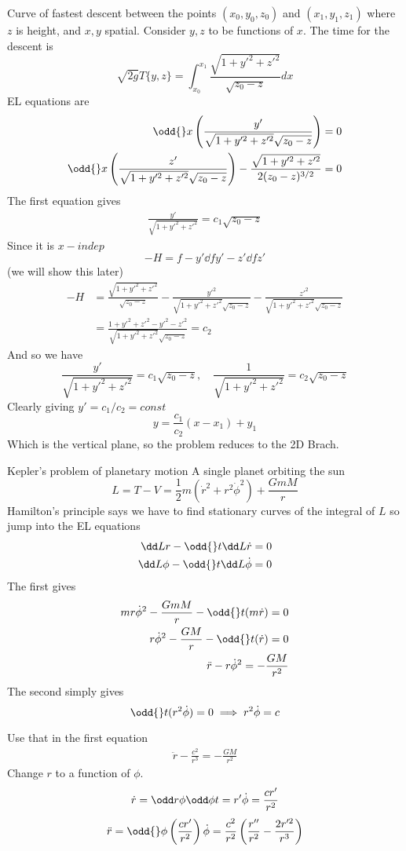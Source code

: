 \documentclass{X:/Documents/Coding/Latex/myassignment}
\begin{document}
Curve of fastest descent between the points $(x_0,y_0,z_0)$ and $(x_1,y_1,z_1)$ where $z$ is height, and $x,y$ spatial. Consider $y,z$ to be functions of $x$. The time for the descent is
\[\sqrt{2g} T\{y,z\} = \int_{x_0}^{x_1} \frac{\sqrt{1 + y'^2 + z'^2}}{\sqrt{z_0 - z}} dx\] 
EL equations are
\begin{align*}
	\odd{}x \left(\frac{y'}{\sqrt{1 + y'^2 + z'^2} \sqrt{z_0 - z}}\right) = 0\\
\odd{}x \left(\frac{z'}{\sqrt{1 + y'^2 + z'^2} \sqrt{z_0 - z}}\right) - \frac{\sqrt{1 + y'^2 + z'^2}}{2(z_0 - z)^{3/2}} = 0
\end{align*}
The first equation gives
\begin{align*}
	\frac{y'}{\sqrt{1 + y'^2 + z'^2}} = c_1\sqrt{z_0-z}
\end{align*}
Since it is $x-indep$
\[-H = f - y'\dd f{y'} - z' \dd f{z'}\]
(we will show this later)
\begin{align*}
	-H &= \frac{\sqrt{1+y'^2+z'^2}}{\sqrt{z_0 -z}} -\frac{y'^2}{\sqrt{1 + y'^2 + z'^2} \sqrt{z_0 - z}} -\frac{z'^2}{\sqrt{1 + y'^2 + z'^2} \sqrt{z_0 - z}}\\
	&=\frac{1 + y'^2 + z'^2 - y'^2 - z'^2}{\sqrt{1 + y'^2 + z'^2} \sqrt{z_0 - z}} = c_2
\end{align*}
And so we have
\[\frac{y'}{\sqrt{1 + y'^2 + z'^2}} = c_1\sqrt{z_0-z}, \quad \frac{1}{\sqrt{1 + y'^2 + z'^2}} = c_2 \sqrt{z_0 - z}\]
Clearly giving $y' = c_1/c_2 = const$
\[y = \frac{c_1}{c_2}(x-x_1) + y_1\]
Which is the vertical plane, so the problem reduces to the 2D Brach.


Kepler's problem of planetary motion
A single planet orbiting the sun
\[L = T-V = \frac12 m(\dot r^2 + r^2 \dot\phi ^2) + \frac{GmM}{r}\]
Hamilton's principle says we have to find stationary curves of the integral of $L$ so jump into the EL equations
\begin{align*}
	\dd Lr - \odd{}t \dd L{\dot r} = 0\\
	\dd L\phi - \odd {}t \dd L{\dot\phi} = 0
\end{align*}
The first gives
\begin{align*}
	mr\dot\phi^2 - \frac{GmM}{r} - \odd{}t (m\dot r) = 0\\
	r\dot\phi^2 - \frac{GM}{r} - \odd{}t (\dot r) = 0\\
	\ddot r - r \dot\phi^2 = -\frac{GM}{r^2}
\end{align*}
The second simply gives
\[\odd{}t (r^2\dot\phi) = 0 \implies r^2\dot\phi = c\]

Use that in the first equation
\begin{align*}
	\ddot r - \frac{c^2}{r^3} = - \frac{GM}{r^2}
\end{align*}
Change $r$ to a function of $\phi$.
\[\dot r = \odd r\phi \odd\phi t = r'\dot \phi = \frac{cr'}{r^2}\]
\[\ddot r = \odd{}\phi \left(\frac{cr'}{r^2}\right)\dot\phi = \frac{c^2}{r^2} \left(\frac{r''}{r^2} - \frac{2r'^2}{r^3}\right)\]
\end{document}

